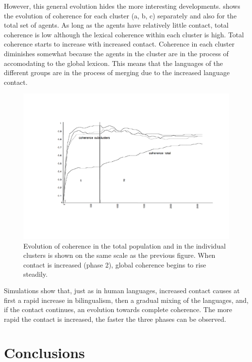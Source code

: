 However, this general evolution hides the more interesting
developments. 
shows the evolution of coherence for each
cluster (a, b, c) separately and
also for the total set of agents. As long as the agents
have relatively little contact, total coherence is low
although the lexical coherence within each cluster is high. 
Total coherence starts to increase with increased contact. Coherence in
each cluster diminishes somewhat because the agents in the
cluster are in the process of accomodating to the global lexicon. 
This means that the
languages of the different groups are in the process of
merging due to the increased language contact.


\begin{figure}[htbp]
  \centerline{\includegraphics[width=\textwidth]{chap5/figs/coherence.pdf}}
\caption{Evolution of coherence in the total population 
and in the individual clusters is shown on the same
scale as the previous figure. When contact 
is increased (phase 2), global coherence begins to rise steadily.}
\label{figure-coherence-in-space}
\end{figure}
Simulations show that, just as in human languages,
increased contact causes at first a rapid increase in
bilingualism, then a gradual mixing of the languages, and, 
if the contact
continues, an evolution towards complete coherence. 
The more rapid the contact is
increased, the faster the three phases can be observed. 

\section{Conclusions}


